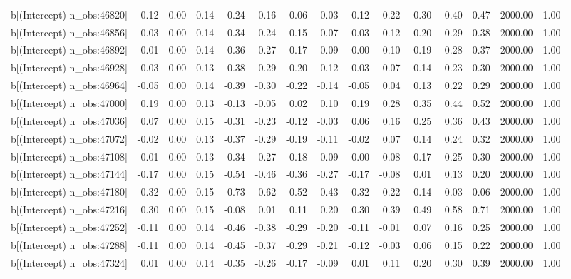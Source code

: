 \begin{table}[ht]
\begin{tabular}{rrrrrrrrrrrrrrr}
  b[(Intercept) n\_obs:46820] & 0.12 & 0.00 & 0.14 & -0.24 & -0.16 & -0.06 & 0.03 & 0.12 & 0.22 & 0.30 & 0.40 & 0.47 & 2000.00 & 1.00 \\ 
  b[(Intercept) n\_obs:46856] & 0.03 & 0.00 & 0.14 & -0.34 & -0.24 & -0.15 & -0.07 & 0.03 & 0.12 & 0.20 & 0.29 & 0.38 & 2000.00 & 1.00 \\ 
  b[(Intercept) n\_obs:46892] & 0.01 & 0.00 & 0.14 & -0.36 & -0.27 & -0.17 & -0.09 & 0.00 & 0.10 & 0.19 & 0.28 & 0.37 & 2000.00 & 1.00 \\ 
  b[(Intercept) n\_obs:46928] & -0.03 & 0.00 & 0.13 & -0.38 & -0.29 & -0.20 & -0.12 & -0.03 & 0.07 & 0.14 & 0.23 & 0.30 & 2000.00 & 1.00 \\ 
  b[(Intercept) n\_obs:46964] & -0.05 & 0.00 & 0.14 & -0.39 & -0.30 & -0.22 & -0.14 & -0.05 & 0.04 & 0.13 & 0.22 & 0.29 & 2000.00 & 1.00 \\ 
  b[(Intercept) n\_obs:47000] & 0.19 & 0.00 & 0.13 & -0.13 & -0.05 & 0.02 & 0.10 & 0.19 & 0.28 & 0.35 & 0.44 & 0.52 & 2000.00 & 1.00 \\ 
  b[(Intercept) n\_obs:47036] & 0.07 & 0.00 & 0.15 & -0.31 & -0.23 & -0.12 & -0.03 & 0.06 & 0.16 & 0.25 & 0.36 & 0.43 & 2000.00 & 1.00 \\ 
  b[(Intercept) n\_obs:47072] & -0.02 & 0.00 & 0.13 & -0.37 & -0.29 & -0.19 & -0.11 & -0.02 & 0.07 & 0.14 & 0.24 & 0.32 & 2000.00 & 1.00 \\ 
  b[(Intercept) n\_obs:47108] & -0.01 & 0.00 & 0.13 & -0.34 & -0.27 & -0.18 & -0.09 & -0.00 & 0.08 & 0.17 & 0.25 & 0.30 & 2000.00 & 1.00 \\ 
  b[(Intercept) n\_obs:47144] & -0.17 & 0.00 & 0.15 & -0.54 & -0.46 & -0.36 & -0.27 & -0.17 & -0.08 & 0.01 & 0.13 & 0.20 & 2000.00 & 1.00 \\ 
  b[(Intercept) n\_obs:47180] & -0.32 & 0.00 & 0.15 & -0.73 & -0.62 & -0.52 & -0.43 & -0.32 & -0.22 & -0.14 & -0.03 & 0.06 & 2000.00 & 1.00 \\ 
  b[(Intercept) n\_obs:47216] & 0.30 & 0.00 & 0.15 & -0.08 & 0.01 & 0.11 & 0.20 & 0.30 & 0.39 & 0.49 & 0.58 & 0.71 & 2000.00 & 1.00 \\ 
  b[(Intercept) n\_obs:47252] & -0.11 & 0.00 & 0.14 & -0.46 & -0.38 & -0.29 & -0.20 & -0.11 & -0.01 & 0.07 & 0.16 & 0.25 & 2000.00 & 1.00 \\ 
  b[(Intercept) n\_obs:47288] & -0.11 & 0.00 & 0.14 & -0.45 & -0.37 & -0.29 & -0.21 & -0.12 & -0.03 & 0.06 & 0.15 & 0.22 & 2000.00 & 1.00 \\ 
  b[(Intercept) n\_obs:47324] & 0.01 & 0.00 & 0.14 & -0.35 & -0.26 & -0.17 & -0.09 & 0.01 & 0.11 & 0.20 & 0.30 & 0.39 & 2000.00 & 1.00 \\ 

\end{tabular}
\end{table}
